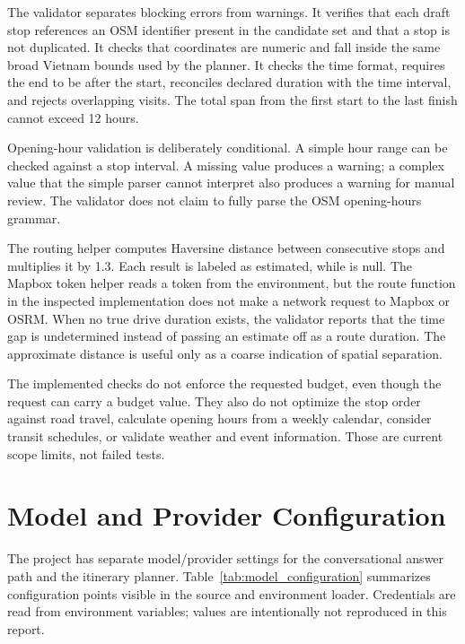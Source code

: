 The validator separates blocking errors from warnings. It verifies that each draft stop references an OSM identifier present in the candidate set and that a stop is not duplicated. It checks that coordinates are numeric and fall inside the same broad Vietnam bounds used by the planner. It checks the  time format, requires the end to be after the start, reconciles declared duration with the time interval, and rejects overlapping visits. The total span from the first start to the last finish cannot exceed 12 hours.

Opening-hour validation is deliberately conditional. A simple hour range can be checked against a stop interval. A missing value produces a warning; a complex value that the simple parser cannot interpret also produces a warning for manual review. The validator does not claim to fully parse the OSM opening-hours grammar.

The routing helper computes Haversine distance between consecutive stops and multiplies it by 1.3. Each result is labeled as estimated, while  is null. The Mapbox token helper reads a token from the environment, but the route function in the inspected implementation does not make a network request to Mapbox or OSRM. When no true drive duration exists, the validator reports that the time gap is undetermined instead of passing an estimate off as a route duration. The approximate distance is useful only as a coarse indication of spatial separation.

The implemented checks do not enforce the requested budget, even though the request can carry a budget value. They also do not optimize the stop order against road travel, calculate opening hours from a weekly calendar, consider transit schedules, or validate weather and event information. Those are current scope limits, not failed tests.

\section{Model and Provider Configuration}

The project has separate model/provider settings for the conversational answer path and the itinerary planner. Table~\ref{tab:model_configuration} summarizes configuration points visible in the source and environment loader. Credentials are read from environment variables; values are intentionally not reproduced in this report.

